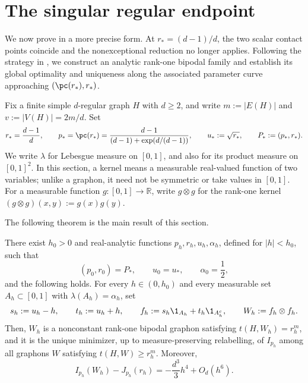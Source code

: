 \section{The singular regular endpoint}
\label{sec:singular-endpoint}

We now prove  in a more precise form.
At $r_*=(d-1)/d$, the two scalar contact points coincide and the
nonexceptional reduction no longer applies.  Following the strategy in
, we construct an analytic rank-one bipodal family
and establish its global optimality and uniqueness along the associated
parameter curve approaching $(\pc(r_*),r_*)$.

Fix a finite simple $d$-regular graph $H$ with $d\ge2$,
and write $m:=|E(H)|$ and $v:=|V(H)|=2m/d$.  Set
\begin{equation*}
  r_*=\frac{d-1}{d},
  \qquad
  p_*=\pc(r_*)
  =\frac{d-1}{(d-1)+\exp(d/(d-1))},
  \qquad
  u_*:=\sqrt{r_*},
  \qquad
  P_*:=(p_*,r_*).
\end{equation*}
We write $\lambda$ for Lebesgue measure on $[0,1]$, and also for its
product measure on $[0,1]^2$.
In this section, a kernel means a measurable real-valued function of two
variables; unlike a graphon, it need not be symmetric or take values in
$[0,1]$.
For a measurable function $g:[0,1]\to\mathbb R$, write $g\otimes g$ for
the rank-one kernel $(g\otimes g)(x,y):=g(x)g(y)$.

The following theorem is the main result of this section.

\begin{theorem}
\label{thm:endpoint-optimality}
There exist $h_0>0$ and real-analytic functions
$p_h,r_h,u_h,\alpha_h$, defined for $|h|<h_0$, such that
\[
  (p_0,r_0)=P_*,
  \qquad
  u_0=u_*,
  \qquad
  \alpha_0=\frac12,
\]
and the following holds.  For every $h\in(0,h_0)$ and every
measurable set $A_h\subset[0,1]$ with $\lambda(A_h)=\alpha_h$, set
\[
  s_h:=u_h-h,
  \qquad
  t_h:=u_h+h,
  \qquad
  f_h:=s_h\1_{A_h}+t_h\1_{A_h^c},
  \qquad
  W_h:=f_h\otimes f_h.
\]
Then, $W_h$ is a nonconstant rank-one bipodal graphon satisfying $t(H,W_h)=r_h^m$,
and it is the unique minimizer, up to measure-preserving relabelling, of
$I_{p_h}$ among all graphons $W$ satisfying $t(H,W)\ge r_h^m$.  Moreover,
\begin{equation*}
  I_{p_h}(W_h)-J_{p_h}(r_h)
  =-\frac{d^3}{3}h^4+O_d(h^6).
\end{equation*}
\end{theorem}

